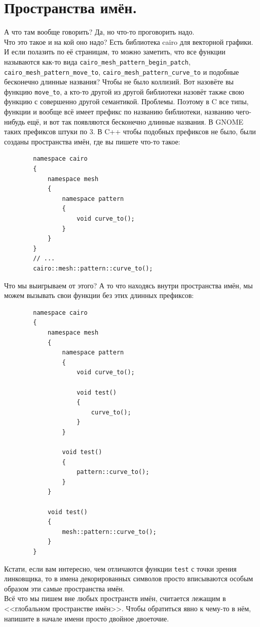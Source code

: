 \documentclass{article}
\begin{document}
    \section{Пространства имён.}
    А что там вообще говорить? Да, но что-то проговорить надо.\\
    Что это такое и на кой оно надо? Есть библиотека cairo для векторной графики. И если полазить по её страницам, то можно заметить, что все функции называются как-то вида \texttt{cairo_mesh_pattern_begin_patch}, \texttt{cairo_mesh_pattern_move_to}, \texttt{cairo_mesh_pattern_curve_to} и подобные бесконечно длинные названия? Чтобы не было коллизий. Вот назовёте вы функцию \texttt{move_to}, а кто-то другой из другой библиотеки назовёт также свою функцию с совершенно другой семантикой. Проблемы. Поэтому в C все типы, функции и вообще всё имеет префикс по названию библиотеки, названию чего-нибудь ещё, и вот так появляются бесконечно длинные названия. В GNOME таких префиксов штуки по 3. В C++ чтобы подобных префиксов не было, были созданы пространства имён, где вы пишете что-то такое:
    \begin{verbatim}
        namespace cairo
        {
            namespace mesh
            {
                namespace pattern
                {
                    void curve_to();
                }
            }
        }
        // ...
        cairo::mesh::pattern::curve_to();
    \end{verbatim}
    Что мы выигрываем от этого? А то что находясь внутри пространства имён, мы можем вызывать свои функции без этих длинных префиксов:
    \begin{verbatim}
        namespace cairo
        {
            namespace mesh
            {
                namespace pattern
                {
                    void curve_to();

                    void test()
                    {
                        curve_to();
                    }
                }

                void test()
                {
                    pattern::curve_to();
                }
            }

            void test()
            {
                mesh::pattern::curve_to();
            }
        }
    \end{verbatim}
    Кстати, если вам интересно, чем отличаются функции \texttt{test} с точки зрения линковщика, то в имена декорированных символов просто вписываются особым образом эти самые пространства имён.\\
    Всё что мы пишем вне любых пространств имён, считается лежащим в <<глобальном пространстве имён>>. Чтобы обратиться явно к чему-то в нём, напишите в начале имени просто двойное двоеточие.
\end{document}
